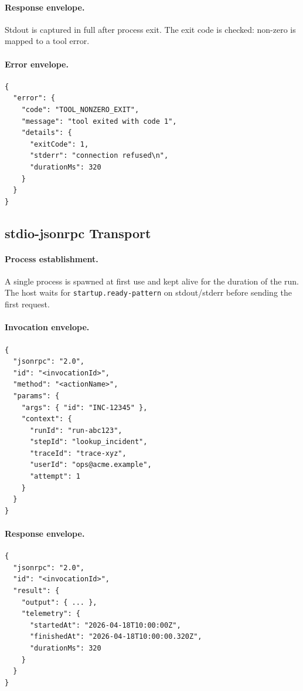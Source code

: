 \paragraph{Response envelope.}
Stdout is captured in full after process exit.  The exit code is checked:
non-zero is mapped to a tool error.

\paragraph{Error envelope.}
\begin{verbatim}
{
  "error": {
    "code": "TOOL_NONZERO_EXIT",
    "message": "tool exited with code 1",
    "details": {
      "exitCode": 1,
      "stderr": "connection refused\n",
      "durationMs": 320
    }
  }
}
\end{verbatim}

\subsection{stdio-jsonrpc Transport}

\paragraph{Process establishment.}
A single process is spawned at first use and kept alive for the duration of the
run.  The host waits for \texttt{startup.ready-pattern} on stdout/stderr before
sending the first request.

\paragraph{Invocation envelope.}
\begin{verbatim}
{
  "jsonrpc": "2.0",
  "id": "<invocationId>",
  "method": "<actionName>",
  "params": {
    "args": { "id": "INC-12345" },
    "context": {
      "runId": "run-abc123",
      "stepId": "lookup_incident",
      "traceId": "trace-xyz",
      "userId": "ops@acme.example",
      "attempt": 1
    }
  }
}
\end{verbatim}

\paragraph{Response envelope.}
\begin{verbatim}
{
  "jsonrpc": "2.0",
  "id": "<invocationId>",
  "result": {
    "output": { ... },
    "telemetry": {
      "startedAt": "2026-04-18T10:00:00Z",
      "finishedAt": "2026-04-18T10:00:00.320Z",
      "durationMs": 320
    }
  }
}
\end{verbatim}

